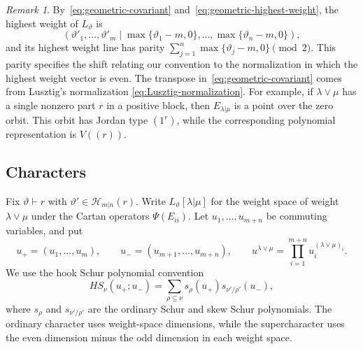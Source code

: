 \documentclass[11pt,a4paper]{amsart}
\theoremstyle{definition}
\theoremstyle{remark}
\newtheorem{remark}[theorem]{Remark}
\newcommand{\lm}{\lambda|\mu}
\numberwithin{equation}{section}
\begin{document}
\begin{remark}\label{rem:polynomial-labels}
By~\eqref{eq:geometric-covariant} and~\eqref{eq:geometric-highest-weight},
the highest weight of $L_\vartheta$ is
$$
(\vartheta'_1,\ldots,\vartheta'_m\mid
 \max\{\vartheta_1-m,0\},\ldots,\max\{\vartheta_n-m,0\}),
$$
and its highest weight line has parity
$\sum_{j=1}^n\max\{\vartheta_j-m,0\}\pmod2$. This parity specifies the
shift relating our convention to the normalization in which the
highest weight vector is even. The transpose
in~\eqref{eq:geometric-covariant} comes from Lusztig's normalization
\eqref{eq:Lusztig-normalization}. For example, if $\lambda\vee\mu$ has a single nonzero part $r$ in a
positive block, then $E_{\lm}$ is a point over the zero orbit. This orbit
has Jordan type $(1^r)$, while the corresponding polynomial
representation is $V((r))$.
\end{remark}

\subsection{Characters}
\label{sec:characters}
Fix $\vartheta\vdash r$ with $\vartheta'\in\mathcal H_{m|n}(r)$. Write $L_\vartheta[\lm]$
for the weight space of weight $\lambda\vee\mu$ under the Cartan
operators $\Psi(E_{ii})$. Let $u_1,\ldots,u_{m+n}$ be commuting
variables, and put
$$
u_+=(u_1,\ldots,u_m),\qquad u_-=(u_{m+1},\ldots,u_{m+n}),\qquad
u^{\lambda\vee\mu}=\prod_{i=1}^{m+n}u_i^{(\lambda\vee\mu)_i}.
$$
We use the hook Schur polynomial convention
\begin{equation}\label{eq:hook-Schur-definition}
HS_\nu(u_+;u_-)
=\sum_{\rho\subseteq\nu}s_\rho(u_+)s_{\nu'/\rho'}(u_-),
\end{equation}
where $s_\rho$ and $s_{\nu'/\rho'}$ are the ordinary Schur and skew
Schur polynomials. The ordinary character uses weight-space
dimensions, while the supercharacter uses the even dimension minus
the odd dimension in each weight space.
\end{document}
